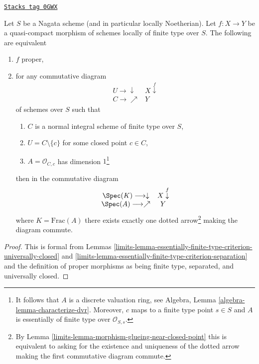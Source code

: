\begin{lemma}
\label{limits-lemma-essentially-finite-type-criterion-proper}
\href{https://stacks.math.columbia.edu/tag/0GWX}{\texttt{Stacks tag 0GWX}}

Let $S$ be a Nagata scheme (and in particular locally Noetherian).
Let $f : X \to Y$ be a quasi-compact morphism of schemes locally
of finite type over $S$. The following are equivalent
\begin{enumerate}
\item $f$ proper,
\item for any commutative diagram
$$
\begin{array}{cc}U \longrightarrow\downarrow & X \overset{f}{\downarrow} \\ C \longrightarrow\nearrow & Y\end{array}
$$
of schemes over $S$ such that
\begin{enumerate}
\item $C$ is a normal integral scheme of finite type over $S$,
\item $U = C \setminus \{c\}$ for some closed point $c \in C$,
\item $A = \mathcal{O}_{C, c}$ has dimension $1$\footnote{It follows
that $A$ is a discrete valuation ring, see
Algebra, Lemma \ref{algebra-lemma-characterize-dvr}.
Moreover, $c$ maps to a finite type point $s \in S$ and
$A$ is essentially of finite type over $\mathcal{O}_{S, s}$.}
\end{enumerate}
then in the commutative diagram
$$
\begin{array}{cc}\Spec(K) \longrightarrow\downarrow & X \overset{f}{\downarrow} \\ \Spec(A) \longrightarrow\nearrow & Y\end{array}
$$
where $K = \text{Frac}(A)$ there exists exactly one dotted arrow\footnote{By
Lemma \ref{limits-lemma-morphism-glueing-near-closed-point} this is
equivalent to asking for the existence and uniqueness of the dotted arrow
making the first commutative diagram commute.}
making the diagram commute.
\end{enumerate}
\end{lemma}

\begin{proof}

This is formal from Lemmas
\ref{limits-lemma-essentially-finite-type-criterion-universally-closed} and
\ref{limits-lemma-essentially-finite-type-criterion-separation}
and the definition of proper morphisms as being finite type, separated,
and universally closed.
\end{proof}

